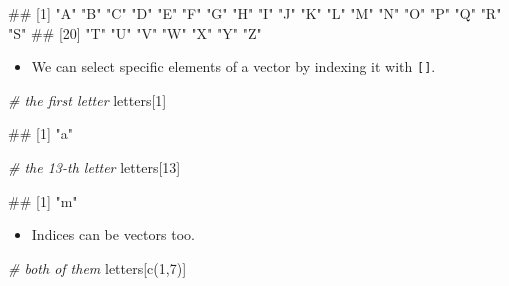 \documentclass[
]{book}
\newenvironment{Shaded}{\begin{snugshade}}{\end{snugshade}}
\newcommand{\CommentTok}[1]{\textcolor[rgb]{0.56,0.35,0.01}{\textit{#1}}}
\newcommand{\DecValTok}[1]{\textcolor[rgb]{0.00,0.00,0.81}{#1}}
\newcommand{\FunctionTok}[1]{\textcolor[rgb]{0.00,0.00,0.00}{#1}}
\newcommand{\NormalTok}[1]{#1}
\providecommand{\tightlist}{%
  \setlength{\itemsep}{0pt}\setlength{\parskip}{0pt}}
\begin{document}
\begin{Shaded}
\begin{Highlighting}[]
\NormalTok{\#\#  [1] "A" "B" "C" "D" "E" "F" "G" "H" "I" "J" "K" "L" "M" "N" "O" "P" "Q" "R" "S"}
\NormalTok{\#\# [20] "T" "U" "V" "W" "X" "Y" "Z"}
\end{Highlighting}
\end{Shaded}

\begin{itemize}
\tightlist
\item
  We can select specific elements of a vector by indexing it with \texttt{{[}{]}}.
\end{itemize}

\begin{Shaded}
\begin{Highlighting}[]
\CommentTok{\# the first letter}
\NormalTok{letters[}\DecValTok{1}\NormalTok{]}
\end{Highlighting}
\end{Shaded}

\begin{Shaded}
\begin{Highlighting}[]
\NormalTok{\#\# [1] "a"}
\end{Highlighting}
\end{Shaded}

\begin{Shaded}
\begin{Highlighting}[]
\CommentTok{\# the 13{-}th letter}
\NormalTok{letters[}\DecValTok{13}\NormalTok{]}
\end{Highlighting}
\end{Shaded}

\begin{Shaded}
\begin{Highlighting}[]
\NormalTok{\#\# [1] "m"}
\end{Highlighting}
\end{Shaded}

\begin{itemize}
\tightlist
\item
  Indices can be vectors too.
\end{itemize}

\begin{Shaded}
\begin{Highlighting}[]
\CommentTok{\# both of them}
\NormalTok{letters[}\FunctionTok{c}\NormalTok{(}\DecValTok{1}\NormalTok{,}\DecValTok{7}\NormalTok{)]}
\end{Highlighting}
\end{Shaded}
\end{document}
